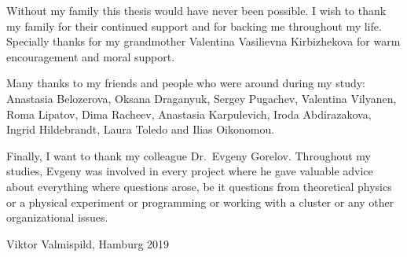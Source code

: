 \documentclass[
12pt, %
english, %
singlespacing, %
liststotoc, %
headsepline, %
]{MastersDoctoralThesis} %
\numberwithin{equation}{section}
\begin{document}
\begin{acknowledgments}
Without my family this thesis would have never been possible. I wish to thank my family for their continued support and for backing me throughout my life. Specially thanks for my grandmother Valentina Vasilievna Kirbizhekova for warm encouragement and moral support.

Many thanks to my friends and people who were around during my study:
Anastasia Belozerova, Oksana Draganyuk, Sergey Pugachev, Valentina Vilyanen, Roma Lipatov, Dima Racheev, Anastasia Karpulevich, Iroda Abdirazakova, Ingrid Hildebrandt, 
Laura Toledo and Ilias Oikonomou.

Finally, I want to thank my colleague Dr.~Evgeny Gorelov. Throughout my studies, Evgeny was involved in every project where he gave valuable advice about everything where questions arose, be it questions from theoretical physics or a physical experiment or programming or working with a cluster or any other organizational issues.

    \vspace{.5cm}

    Viktor Valmispild,
Hamburg 2019
\end{acknowledgments}
\end{document}
